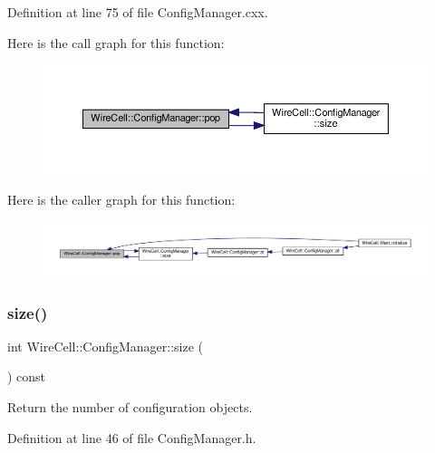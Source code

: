 Definition at line 75 of file Config\+Manager.\+cxx.

Here is the call graph for this function\+:
\nopagebreak
\begin{figure}[H]
\begin{center}
\leavevmode
\includegraphics[width=350pt]{class_wire_cell_1_1_config_manager_a4168a64d0957e95cf64565ef8f74fbf8_cgraph}
\end{center}
\end{figure}
Here is the caller graph for this function\+:
\nopagebreak
\begin{figure}[H]
\begin{center}
\leavevmode
\includegraphics[width=350pt]{class_wire_cell_1_1_config_manager_a4168a64d0957e95cf64565ef8f74fbf8_icgraph}
\end{center}
\end{figure}
\mbox{\label{class_wire_cell_1_1_config_manager_ad47aaaeff27496deac1eb2eae1bd01c8}} 
\subsubsection{\texorpdfstring{size()}{size()}}
{\footnotesize\ttfamily int Wire\+Cell\+::\+Config\+Manager\+::size (\begin{DoxyParamCaption}{ }\end{DoxyParamCaption}) const\hspace{0.3cm}{\ttfamily [inline]}}



Return the number of configuration objects. 



Definition at line 46 of file Config\+Manager.\+h.

